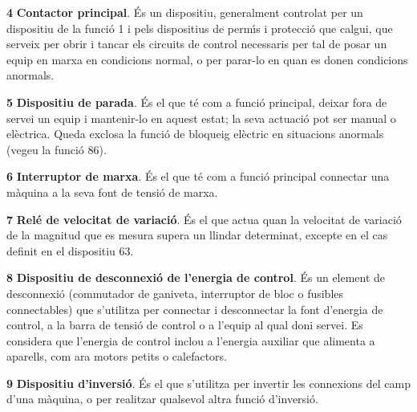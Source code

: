 \begin{multicols}{2}
\begin{list}{}
\item[\textbf{4}]  
 \textbf{Contactor principal}. \'{E}s un dispositiu,
generalment controlat per un dispositiu de la funci\'{o} 1 i pels dispositius de perm\'{\i}s i protecci\'{o}
que calgui, que serveix per obrir i tancar els circuits de control necessaris per tal de
posar un equip en marxa en condicions normal, o per parar-lo en quan es donen condicions anormals.

\item[\textbf{5}]    
 \textbf{Dispositiu de parada}. \'{E}s el que
t\'{e} com a funci\'{o} principal, deixar fora de servei un equip i
mantenir-lo en aquest estat; la seva actuaci\'{o} pot ser manual o
el\`{e}ctrica. Queda exclosa la funci\'{o} de bloqueig el\`{e}ctric en
situacions anormals (vegeu la funci\'{o} 86).

\item[\textbf{6}]  
\textbf{Interruptor de marxa}. \'{E}s
el que t\'{e} com a funci\'{o} principal connectar una m\`{a}quina a la seva font de tensi\'{o} de marxa.

\item[\textbf{7}]    
\textbf{Rel\'{e} de velocitat de variaci\'{o}}. \'{E}s el que
actua quan la velocitat de variaci\'{o} de la magnitud que es mesura supera un llindar determinat, excepte en el cas definit en el dispositiu 63.

\item[\textbf{8}]   
\textbf{Dispositiu de desconnexi\'{o} de l'energia
de control}. \'{E}s un element de desconnexi\'{o} (commutador de ganiveta,
interruptor de bloc o fusibles connectables) que s'utilitza per
connectar i desconnectar la font d'energia de control,  a la barra
de tensi\'{o} de control o a l'equip al qual doni servei. Es considera
que l'energia de control inclou a l'energia auxiliar que alimenta a
aparells, com ara motors petits o calefactors.

\item[\textbf{9}]   
\textbf{Dispositiu d'inversi\'{o}}. \'{E}s el
que s'utilitza per invertir les connexions del camp d'una m\`{a}quina, o
per realitzar qualsevol altra funci\'{o}  d'inversi\'{o}.


\end{list}
\end{multicols}
